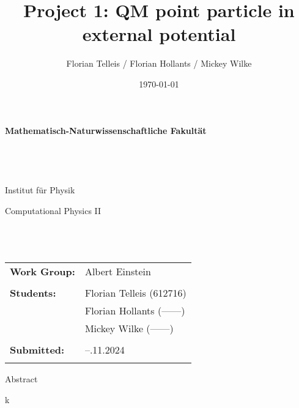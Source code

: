 \documentclass[11pt, letterpaper, onecolumn]{article}
\title{Project 1: QM point particle in external potential}
\author{Florian Telleis / Florian Hollants / Mickey Wilke}
\date{\today}
\begin{document}
	
	\begin{titlepage}
		\thispagestyle{empty}
		\begin{figure}
			
		\end{figure}
		\vspace*{-43mm}\hspace{-6mm}\textbf{\textcolor{pantone294}{\large{Mathematisch-Naturwissenschaftliche Fakultät}}}\\\\\\\\\\
		\textcolor{pantone294}{Institut für Physik}\\
		\vspace{30mm}
		\begin{center}
			\textcolor{pantone294}{\huge{Computational Physics II}}\\\vspace*{7mm}
			\textcolor{pantone294}{\huge{\textbf{\thetitle}}}\\\vspace*{10mm}
			\textcolor{pantone294}{\theauthor}\\\vspace*{10mm}
			\textcolor{pantone294}{\thedate}\\\vspace*{20mm}
			\begin{tabular}{ll}
				\textbf{Work Group:} & Albert Einstein	 \\ \\
				\textbf{Students:} & Florian Telleis (612716) \\
									& Florian Hollants (------)\\
									& Mickey  Wilke (------)\\ \\
				\textbf{Submitted:} & --.11.2024 \\ \\				
			\end{tabular}
		\end{center}
	\end{titlepage}
	\makeatother
	\restoregeometry
		
		\newpage
	
	
	
	
	\begin{center}
	\Large{Abstract}
	\end{center}
	k\\
	\vspace{1cm}
	
\end{document}
